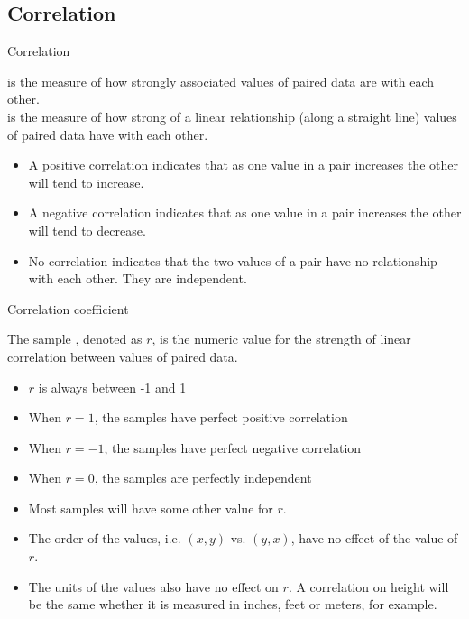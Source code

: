 \documentclass[xcolor=table, aspectratio=169, bigger]{beamer}
\begin{document}
%
%
\subsection{Correlation}

\begin{frame}{Correlation}
\begin{block}{}
 is the measure of how strongly associated values of paired data are with each other.\\
\pause\medskip
{} is the measure of how strong of a linear relationship (along a straight line)  values of paired data have with each other. 
\begin{itemize}
\pause\item A positive correlation indicates that as one value in a pair increases the other will tend to increase.
\pause\item A negative correlation indicates that as one value in a pair increases the other will tend to decrease.
\pause\item No correlation indicates that the two values of a pair have no relationship with each other. They are independent.
\end{itemize}
\end{block}
\end{frame}

\begin{frame}{Correlation coefficient}
\begin{block}{}
The sample , denoted as $r$, is the numeric value for the strength of linear correlation between values of paired data.
\begin{itemize}
\pause\item $r$ is always between -1 and 1
\pause\item When $r=1$, the samples have perfect positive correlation
\pause\item When $r=-1$, the samples have perfect negative correlation
\pause\item When $r=0$, the samples are perfectly independent
\pause\item Most samples will have some other value for $r$. 
\pause\item The order of the values, i.e. $(x,y)$ vs. $(y,x)$, have no effect of the value of $r$.
\pause\item The units of the values also have no effect on $r$. A correlation on height will be the same whether it is measured in inches, feet or meters, for example.
\end{itemize}
\end{block}
\end{frame}
\end{document}
